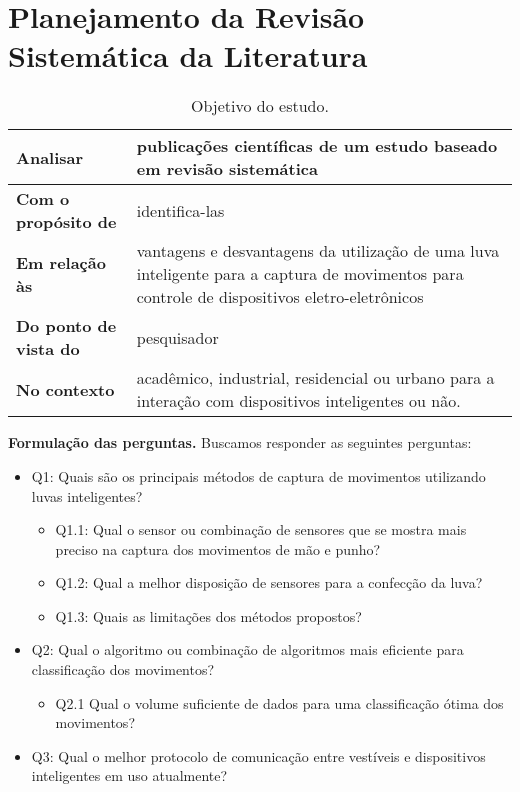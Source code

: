 	\section{Planejamento da Revisão Sistemática da Literatura}
\begin{table}[h!]
	\centering
    \caption{Objetivo do estudo.}
    \label{tab:rsl}
	\begin{tabularx}{\textwidth}{|l|X|}
    	\hline
		\textbf{Analisar} & publicações científicas de um estudo baseado em revisão sistemática \\
        \hline
        \textbf{Com o propósito de} & identifica-las \\
        \hline
        \textbf{Em relação às} & vantagens e desvantagens da utilização de uma luva inteligente para a captura de movimentos para controle de dispositivos eletro-eletrônicos \\
        \hline
        \textbf{Do ponto de vista do} & pesquisador \\
        \hline
        \textbf{No contexto} & acadêmico, industrial, residencial ou urbano para a interação com dispositivos inteligentes ou não. \\
        \hline
	\end{tabularx}

\end{table}

\textbf{Formulação das perguntas.} Buscamos responder as seguintes perguntas:

\begin{itemize}
	\item Q1: Quais são os principais métodos de captura de movimentos utilizando luvas inteligentes?
    \begin{itemize}
    	\item Q1.1:  Qual o sensor ou combinação de sensores que se mostra mais preciso na captura dos movimentos de mão e punho?
        \item Q1.2: Qual a melhor disposição de sensores para a confecção da luva?
        \item Q1.3: Quais as limitações dos métodos propostos?
    \end{itemize}
    \item Q2: Qual o algoritmo ou combinação de algoritmos mais eficiente para classificação dos movimentos?
    \begin{itemize}
    	\item Q2.1 Qual o volume suficiente de dados para uma classificação ótima dos movimentos?
    \end{itemize}
    \item Q3: Qual o melhor protocolo de comunicação entre vestíveis e dispositivos inteligentes em uso atualmente?
\end{itemize}

